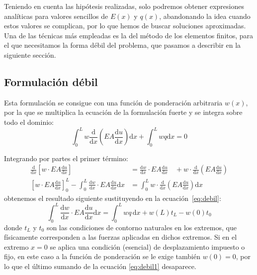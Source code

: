 \documentclass[spanish,a4paper,12pt]{article}
\begin{document}
Teniendo en cuenta las hipótesis realizadas, solo podremos obtener expresiones analíticas para valores sencillos de $E(x)$ y $q(x)$, abandonando la idea cuando estos valores se complican, por lo que hemos de buscar soluciones aproximadas. Una de las técnicas más empleadas es la del método de los elementos finitos, para el que necesitamos la forma débil del problema, que pasamos a describir en la siguiente sección.

\subsection{Formulación débil}
\label{sec:debil}

Esta formulación se consigue con una función de ponderación arbitraria $w(x)$, por la que se multiplica la ecuación de la formulación fuerte y se integra sobre todo el dominio:
\begin{equation}\label{eq:debil}
\int_{0}^{L} w \frac{\mathrm{d}}{\mathrm{d} x}\left(EA \frac{\mathrm{d} u}{\mathrm{d} x}\right) \mathrm{d} x+\int_{0}^{L} w q \mathrm{d} x=0
\end{equation}

Integrando por partes el primer término:
\begin{align}\label{eq:partes}
\frac{\mathrm{d}}{\mathrm{d} x}\left[w \cdot EA \frac{\mathrm{d} u}{\mathrm{d} x}\right] &=\frac{\mathrm{d} w}{\mathrm{d} x} \cdot EA \frac{\mathrm{d} u}{\mathrm{d} x} \quad+w \cdot \frac{\mathrm{d}}{\mathrm{d} x}\left(EA \frac{\mathrm{d} u}{\mathrm{d} x}\right) \nonumber\\
\left[w \cdot EA \frac{\mathrm{d} u}{\mathrm{d} x}\right]_{0}^{L}-\int_{0}^{L} \frac{\mathrm{d} w}{\mathrm{d} x} \cdot EA \frac{\mathrm{d} u}{\mathrm{d} x} \mathrm{d} x &=\int_{0}^{L} w \cdot \frac{\mathrm{d}}{\mathrm{d} x}\left(EA \frac{\mathrm{d} u}{\mathrm{d} x}\right) \mathrm{d} x
\end{align}
obtenemos el resultado siguiente sustituyendo en la ecuación~\eqref{eq:debil}:
\begin{equation}\label{eq:debil1}
\int_{0}^{L} \frac{\mathrm{d} w}{\mathrm{d} x} \cdot EA \frac{\mathrm{d} u}{\mathrm{d} x} \mathrm{d} x=\int_{0}^{L} w q \,\mathrm{d} x+w(L) t_{L}-w(0) t_{0}
\end{equation}
donde $t_{L}$ y $t_{0}$ son las condiciones de contorno naturales en los extremos, que físicamente corresponden a las fuerzas aplicadas en dichos extremos.
Si en el extremo $x=0$ se aplica una condición (esencial) de desplazamiento impuesto o fijo, en este caso a la función de ponderación se le exige también $w(0)=0$, por lo que el último sumando de la ecuación \eqref{eq:debil1} desaparece.
\end{document}
